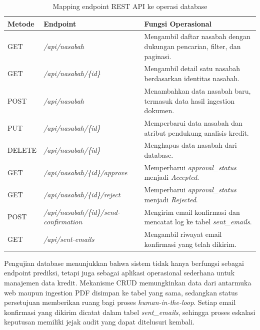 \begin{table}[H]
\centering
\caption{Mapping endpoint REST API ke operasi database}
\label{tab:bab4_database_crud}
\begin{tabular}{|p{}|p{}|p{}|}
\hline
\textbf{Metode} & \textbf{Endpoint} & \textbf{Fungsi Operasional} \\
\hline
GET & \textit{/api/nasabah} & Mengambil daftar nasabah dengan dukungan pencarian, filter, dan paginasi. \\
\hline
GET & \textit{/api/nasabah/\{id\}} & Mengambil detail satu nasabah berdasarkan identitas nasabah. \\
\hline
POST & \textit{/api/nasabah} & Menambahkan data nasabah baru, termasuk data hasil ingestion dokumen. \\
\hline
PUT & \textit{/api/nasabah/\{id\}} & Memperbarui data nasabah dan atribut pendukung analisis kredit. \\
\hline
DELETE & \textit{/api/nasabah/\{id\}} & Menghapus data nasabah dari database. \\
\hline
GET & \textit{/api/nasabah/\{id\}/approve} & Memperbarui \textit{approval\_status} menjadi \textit{Accepted}. \\
\hline
GET & \textit{/api/nasabah/\{id\}/reject} & Memperbarui \textit{approval\_status} menjadi \textit{Rejected}. \\
\hline
POST & \textit{/api/nasabah/\{id\}/send-confirmation} & Mengirim email konfirmasi dan mencatat log ke tabel \textit{sent\_emails}. \\
\hline
GET & \textit{/api/sent-emails} & Mengambil riwayat email konfirmasi yang telah dikirim. \\
\hline
\end{tabular}
\end{table}

Pengujian database menunjukkan bahwa sistem tidak hanya berfungsi sebagai endpoint prediksi, tetapi juga sebagai aplikasi operasional sederhana untuk manajemen data kredit. Mekanisme CRUD memungkinkan data dari antarmuka web maupun ingestion PDF disimpan ke tabel yang sama, sedangkan status persetujuan memberikan ruang bagi proses \textit{human-in-the-loop}. Setiap email konfirmasi yang dikirim dicatat dalam tabel \textit{sent\_emails}, sehingga proses eskalasi keputusan memiliki jejak audit yang dapat ditelusuri kembali.

